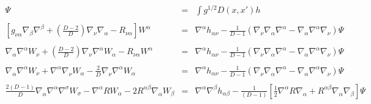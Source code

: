 \documentclass[10pt,letterpaper]{article}
\numberwithin{equation}{section}
\begin{document}
\begin{eqnarray}
\Psi &=& \int g^{1/2} D(x,x') h
\\ \nonumber\\
\left[g_{\nu\alpha}\nabla_\beta\nabla^\beta + \left(\frac{D-2}{D}\right)\nabla_\nu \nabla_\alpha - R_{\nu\alpha}\right]W^\alpha &=&
\nabla^\alpha h_{\alpha\nu} - \frac{1}{D-1}\left(\nabla_\nu \nabla_\alpha\nabla^\alpha - \nabla_\alpha\nabla^\alpha \nabla_\nu\right)
\Psi
\\\nonumber \\
\nabla_\alpha\nabla^\alpha W_\nu + \left(\frac{D-2}{D}\right)\nabla_\nu \nabla^\alpha W_\alpha - R_{\nu\alpha}W^\alpha &=&
\nabla^\alpha h_{\alpha\nu} - \frac{1}{D-1}\left(\nabla_\nu \nabla_\alpha\nabla^\alpha - \nabla_\alpha\nabla^\alpha \nabla_\nu\right)
\Psi
\\\nonumber \\
\nabla_\alpha \nabla^\alpha W_\nu +\nabla^\alpha \nabla_\nu W_\alpha - \frac{2}{D}\nabla_\nu\nabla^\alpha W_\alpha&=&
\nabla^\alpha h_{\alpha\nu} - \frac{1}{D-1}\left(\nabla_\nu \nabla_\alpha\nabla^\alpha - \nabla_\alpha\nabla^\alpha \nabla_\nu\right)
\Psi
\\ \nonumber\\
\frac{2(D-1)}{D}\nabla_\alpha\nabla^\alpha \nabla^\sigma W_\sigma - \nabla^\alpha R W_\alpha - 2R^{\alpha\beta} \nabla_\alpha W_{\beta} &=& 
\nabla^\alpha\nabla^\beta h_{\alpha\beta} - \frac{1}{(D-1)}\left[ \tfrac12 \nabla^\alpha R \nabla_\alpha + R^{\alpha\beta}\nabla_\alpha\nabla_\beta\right]\Psi
\end{eqnarray}
%
%
%
\end{document}
